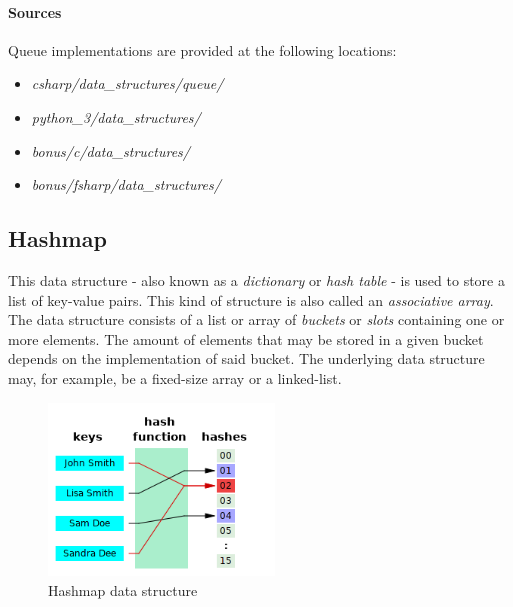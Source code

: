 \documentclass{article}
\begin{document}
\begin{samepage}
  \paragraph{Sources}
  Queue implementations are provided at the following locations:
  \begin{itemize}
  \item{{\em csharp/data\_structures/queue/}}
  \item{{\em python\_3/data\_structures/}}
  \item{{\em bonus/c/data\_structures/}}
  \item{{\em bonus/fsharp/data\_structures/}}
  \end{itemize}
\end{samepage}




\subsection{Hashmap}
This data structure - also known as a {\em dictionary} or {\em hash table} - is used to store a list of
key-value pairs. This kind of structure is also called an {\em associative array}. The data structure
consists of a list or array of {\em buckets} or {\em slots} containing one or more elements. The amount
of elements that may be stored in a given bucket depends on the implementation of said bucket.
The underlying data structure may, for example, be a fixed-size array or a linked-list.

\begin{figure}[H]
    \centering
    \includegraphics[width=6cm]{hash_map}
    \caption{Hashmap data structure}
\end{figure}
\end{document}
